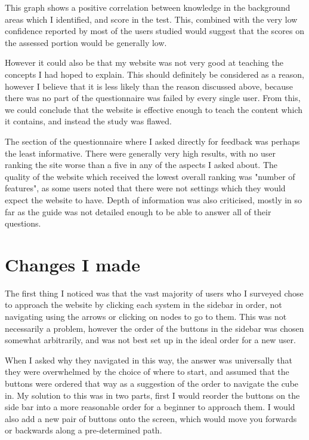 \documentclass{l4proj}
\begin{document}
This graph shows a positive correlation between knowledge in the background areas which I identified, and score in the test.  This, combined with the very low confidence reported by most of the users studied would suggest that the scores on the assessed portion would be generally low.

However it could also be that my website was not very good at teaching the concepts I had hoped to explain.  This should definitely be considered as a reason, however I believe that it is less likely than the reason discussed above, because there was no part of the questionnaire was failed by every single user.  From this, we could conclude that the website is effective enough to teach the content which it contains, and instead the study was flawed.

The section of the questionnaire where I asked directly for feedback was perhaps the least informative.  There were generally very high results, with no user ranking the site worse than a five in any of the aspects I asked about.  The quality of the website which received the lowest overall ranking was "number of features", as some users noted that there were not settings which they would expect the website to have.  Depth of information was also criticised, mostly in so far as the guide was not detailed enough to be able to answer all of their questions.

\section{Changes I made}

The first thing I noticed was that the vast majority of users who I surveyed chose to approach the website by clicking each system in the sidebar in order, not navigating using the arrows or clicking on nodes to go to them.  This was not necessarily a problem, however the order of the buttons in the sidebar was chosen somewhat arbitrarily, and was not best set up in the ideal order for a new user.

When I asked why they navigated in this way, the answer was universally that they were overwhelmed by the choice of where to start, and assumed that the buttons were ordered that way as a suggestion of the order to navigate the cube in.  My solution to this was in two parts, first I would reorder the buttons on the side bar into a more reasonable order for a beginner to approach them.  I would also add a new pair of buttons onto the screen, which would move you forwards or backwards along a pre-determined path.
\end{document}
